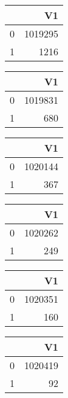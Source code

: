 \bigskip\bigskip
\centering
\begin{tabular}{rr}
  \hline
 & V1 \\ 
  \hline
0 & 1019295 \\ 
  1 & 1216 \\ 
   \hline
\end{tabular}

\bigskip\bigskip
\centering
\begin{tabular}{rr}
  \hline
 & V1 \\ 
  \hline
0 & 1019831 \\ 
  1 & 680 \\ 
   \hline
\end{tabular}

\bigskip\bigskip
\centering
\begin{tabular}{rr}
  \hline
 & V1 \\ 
  \hline
0 & 1020144 \\ 
  1 & 367 \\ 
   \hline
\end{tabular}

\bigskip\bigskip
\centering
\begin{tabular}{rr}
  \hline
 & V1 \\ 
  \hline
0 & 1020262 \\ 
  1 & 249 \\ 
   \hline
\end{tabular}

\bigskip\bigskip
\centering
\begin{tabular}{rr}
  \hline
 & V1 \\ 
  \hline
0 & 1020351 \\ 
  1 & 160 \\ 
   \hline
\end{tabular}

\bigskip\bigskip
\centering
\begin{tabular}{rr}
  \hline
 & V1 \\ 
  \hline
0 & 1020419 \\ 
  1 &  92 \\ 
   \hline
\end{tabular}

